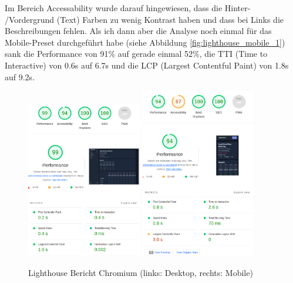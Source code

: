 Im Bereich Accessability wurde darauf hingewiesen, dass die Hinter- /Vordergrund (Text) Farben zu wenig Kontrast haben und dass bei Links die Beschreibungen fehlen. Als ich dann aber die Analyse noch einmal für das Mobile-Preset durchgeführt habe (siehe Abbildung \ref{fig:lighthouse_mobile_1}) 
sank die Performance von 91\% auf gerade einmal 52\%, die TTI (Time to Interactive) von 0.6s auf 6.7s und die LCP (Largest Contentful Paint) von 1.8s auf 9.2s.

\begin{figure}[th]
    \centering
    \includegraphics[width=0.45\textwidth]{Figures/lighthouse_desktop_4.png}
    \includegraphics[width=0.45\textwidth]{Figures/lighthouse_mobile_2.png}
    \decoRule
    \caption[Turbomeet Lighthouse Bericht Chromium]{Lighthouse Bericht Chromium (links: Desktop, rechts: Mobile)}
    \label{fig:lighthouse_mobile_2}
\end{figure}

